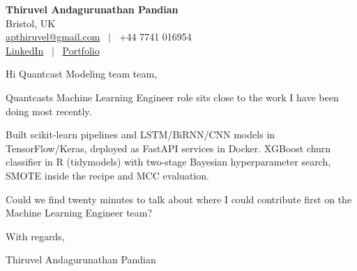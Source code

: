 \documentclass[11pt,a4paper]{article}
\begin{document}
\raggedright
\pagestyle{empty}

\begin{center}
    {\LARGE \color{linkblue} \textbf{Thiruvel Andagurunathan Pandian}}\\[0.2cm]
    Bristol, UK \\
    \href{mailto:apthiruvel@gmail.com}{apthiruvel@gmail.com} \ $|$ \ +44 7741 016954 \\
\href{https://www.linkedin.com/in/thiruvel-a-p/}{LinkedIn} \ $|$ \ \href{https://thiruvel-ap.github.io/PersonalPortfolio/}{Portfolio}
\end{center}

\vspace{0.4cm}

\noindent
Hi Quantcast Modeling team team,

Quantcast\textquotesingle{}s Machine Learning Engineer role sits close to the work I have been doing most recently.

Built scikit-learn pipelines and LSTM/BiRNN/CNN models in TensorFlow/Keras, deployed as FastAPI services in Docker. XGBoost churn classifier in R (tidymodels) with two-stage Bayesian hyperparameter search, SMOTE inside the recipe and MCC evaluation.

Could we find twenty minutes to talk about where I could contribute first on the Machine Learning Engineer team?

\vspace{0.5cm}

With regards,

Thiruvel Andagurunathan Pandian
\end{document}
